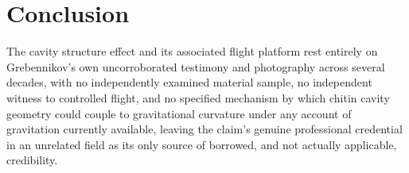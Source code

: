 \documentclass[11pt]{article}
\begin{document}
\section{Conclusion}

The cavity structure effect and its associated flight platform rest entirely on Grebennikov's own uncorroborated testimony and photography across several decades, with no independently examined material sample, no independent witness to controlled flight, and no specified mechanism by which chitin cavity geometry could couple to gravitational curvature under any account of gravitation currently available, leaving the claim's genuine professional credential in an unrelated field as its only source of borrowed, and not actually applicable, credibility.
\end{document}
